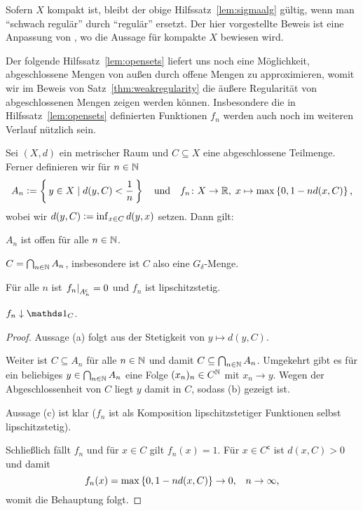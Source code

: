 \documentclass[../main/main.tex]{subfiles}
\begin{document}
	\begin{Bemerkung}
		Sofern $X$ kompakt ist, bleibt der obige Hilfssatz~\ref{lem:sigmaalg} gültig, wenn man \enquote{schwach regulär} durch \enquote{regulär} ersetzt. Der hier vorgestellte Beweis ist eine Anpassung von \cite[Lemma 4.5.5]{Simon.2015}, wo die Aussage für kompakte $X$ bewiesen wird.
	\end{Bemerkung}

	Der folgende Hilfssatz~\ref{lem:opensets} liefert uns noch eine Möglichkeit, 
	abgeschlossene Mengen von außen durch offene Mengen zu approximieren, womit wir im 
	Beweis von Satz~\ref{thm:weakregularity} die äußere Regularität von abgeschlossenen 
	Mengen zeigen werden können. Insbesondere die in Hilfssatz~\ref{lem:opensets} definierten 
	Funktionen $f_n$ werden auch noch im weiteren Verlauf nützlich sein.
	
	\begin{Hilfssatz}
		\label{lem:opensets}
		Sei $(X, d)$ ein metrischer Raum und $C \subseteq X$ eine abgeschlossene 
		Teilmenge. Ferner definieren wir für $n \in \mathbb{N}$
		$$ A_n \vcentcolon = \left\{\, y \in X \; | \; d(y, C) < \frac{1}{n} \,\right\} \quad \text{und} \quad 
		f_n \colon X \to \mathbb{R}, \; x \mapsto \max \left\{0, 1-n d(x, C)\right\}  \text{,}$$
		wobei wir $d(y, C) \vcentcolon = \inf_{x \in C} d(y, x)$ setzen.
		Dann gilt:
		\begin{enumeratethm}
			\item $A_n$ ist offen für alle $n \in \mathbb{N}$.
			\item $C = \bigcap_{n \in \mathbb{N}} A_n$, insbesondere ist $C$ also eine $G_\delta$-Menge.
			\item Für alle $n$ ist $\left.f_n\right|_{A_n^\mathsf{c}} = 0$ und $f_n$ ist lipschitzstetig.
			\item $f_n \convdown \indfct_C$.
		\end{enumeratethm}
	\end{Hilfssatz}

	\begin{proof}
		Aussage (a) folgt aus der Stetigkeit von $y \mapsto d(y, C)$.
		
		Weiter ist $C \subseteq A_n$ für alle $n \in \mathbb{N}$ und damit 
		$C \subseteq \bigcap_{n \in \mathbb{N}} A_n$. 
		Umgekehrt gibt es für ein beliebiges $y \in \bigcap_{n \in \mathbb{N}} A_n$
		eine Folge $(x_n)_n \in C^{\mathbb{N}}$ mit $x_n \rightarrow y$. 
		Wegen der Abgeschlossenheit von $C$ liegt $y$ damit in $C$, sodass (b) gezeigt ist.
		
		Aussage (c) ist klar ($f_n$ ist als Komposition lipschitzstetiger Funktionen selbst lipschitzstetig).
		
		Schließlich fällt $f_n$ und für $x \in C$ gilt $f_n(x) = 1$. Für $x \in C^\mathsf{c}$ ist $d(x, C) > 0$ und damit
		$$f_n(x) = \max \left\{0, 1-n d(x, C)\right\} \to 0 \text{,} \quad n \to \infty \text{,}$$
		womit die Behauptung folgt.
	\end{proof}
\end{document}
